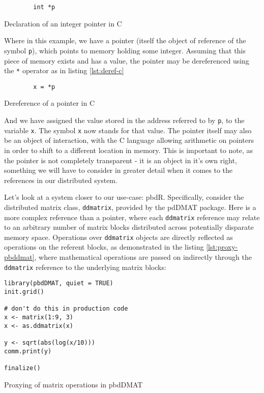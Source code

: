 \begin{listing}
    \begin{verbatim}
        int *p
    \end{verbatim}
    \caption{Declaration of an integer pointer in C}
    \label{lst:declare-int-pointer}
\end{listing}

Where in this example, we have a pointer (itself the object of reference
of the symbol \texttt{p}), which points to memory holding some integer.
Assuming that this piece of memory exists and has a value, the pointer
may be dereferenced using the \texttt{*} operator as in listing \ref{lst:deref-c}

\begin{listing}
    \begin{verbatim}
        x = *p
    \end{verbatim}
    \caption{Dereference of a pointer in C}
    \label{lst:deref-c}
\end{listing}

And we have assigned the value stored in the address referred to by
\texttt{p}, to the variable \texttt{x}. The symbol \texttt{x} now stands
for that value. The pointer itself may also be an object of interaction,
with the C language allowing arithmetic on pointers in order to shift to
a different location in memory. This is important to note, as the
pointer is not completely transparent - it is an object in it's own
right, something we will have to consider in greater detail when it
comes to the references in our distributed system.

Let's look at a system closer to our use-case: pbdR. Specifically,
consider the distributed matrix class, \texttt{ddmatrix}, provided by
the pdDMAT package. Here is a more complex reference than a pointer,
where each \texttt{ddmatrix} reference may relate to an arbitrary number
of matrix blocks distributed across potentially disparate memory space.
Operations over \texttt{ddmatrix} objects are directly reflected as
operations on the referent blocks, as demonstrated in the listing \ref{lst:proxy-pbddmat},
where mathematical operations are passed on indirectly through
the \texttt{ddmatrix} reference to the underlying matrix blocks:

\begin{listing}
    \begin{verbatim}
library(pbdDMAT, quiet = TRUE)
init.grid()

# don't do this in production code
x <- matrix(1:9, 3)
x <- as.ddmatrix(x)

y <- sqrt(abs(log(x/10)))
comm.print(y)

finalize()
    \end{verbatim}
    \caption{Proxying of matrix operations in pbdDMAT}
    \label{lst:proxy-pbddmat}
\end{listing}


